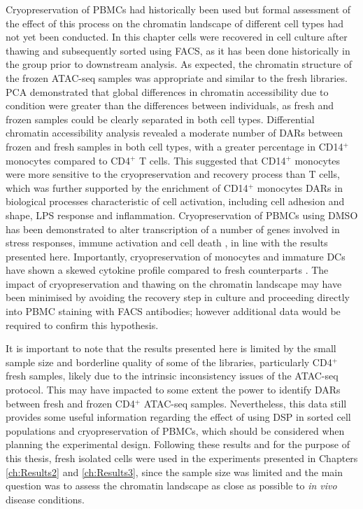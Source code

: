 Cryopreservation of PBMCs had historically been used but formal assessment of the effect of this process on the chromatin landscape of different cell types had not yet been conducted. In this chapter cells were recovered in cell culture after thawing and subsequently sorted using FACS, as it has been done historically in the group prior to downstream analysis. As expected, the chromatin structure of the frozen ATAC-seq samples was appropriate and similar to the fresh libraries. PCA demonstrated that global differences in chromatin accessibility due to condition were greater than the differences between individuals, as fresh and frozen samples could be clearly separated in both cell types. Differential chromatin accessibility analysis revealed a moderate number of DARs between frozen and fresh samples in both cell types, with a greater percentage in CD14$^+$ monocytes compared to CD4$^+$ T cells. This suggested that CD14$^+$ monocytes were more sensitive to the cryopreservation and recovery process than T cells, which was further supported by the enrichment of CD14$^+$ monocytes DARs in biological processes characteristic of cell activation, including cell adhesion and shape, LPS response and inflammation. Cryopreservation of PBMCs using DMSO has been demonstrated to alter transcription of a number of genes involved in stress responses, immune activation and cell death \parencite{Yang2016}, in line with the results presented here. Importantly, cryopreservation of monocytes and immature DCs have shown a skewed cytokine profile compared to fresh counterparts \parencite{Meijerink2011}.  The impact of cryopreservation and thawing on the chromatin landscape may have been minimised by avoiding the recovery step in culture and proceeding directly into PBMC staining with FACS antibodies; however additional data would be required to confirm this hypothesis.

It is important to note that the results presented here is limited by the small sample size and borderline quality of some of the libraries, particularly CD4$^+$ fresh samples, likely due to the intrinsic inconsistency issues of the ATAC-seq protocol. This may have impacted to some extent the power to identify DARs between fresh and frozen CD4$^+$ ATAC-seq samples. Nevertheless, this data still provides some useful information regarding the effect of using DSP in sorted cell populations and cryopreservation of PBMCs, which should be considered when planning the experimental design. Following these results and for the purpose of this thesis, fresh isolated cells were used in the experiments presented in Chapters \ref{ch:Results2} and \ref{ch:Results3}, since the sample size was limited and the main question was to assess the chromatin landscape as close as possible to \textit{in vivo} disease conditions. 

